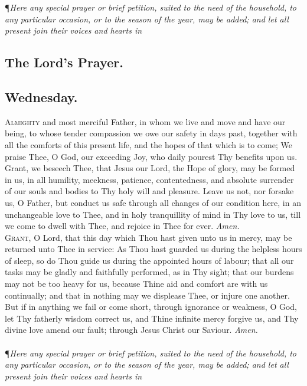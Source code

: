 \noindent\P\textit{Here any special prayer or brief petition, suited to the need of the
household, to any particular occasion, or to the season of the
year, may be added; and let all present join their voices and
hearts in}

\subsection*{The Lord's Prayer.}

\subsection*{Wednesday.}

\lettrine{A}{lmighty} and most merciful Father, in whom we
live and move and have our being, to whose tender
compassion we owe our safety in days past, together with
all the comforts of this present life, and the hopes of that
which is to come; We praise Thee, O God, our exceeding
Joy, who daily pourest Thy benefits upon us. Grant, we
beseech Thee, that Jesus our Lord, the Hope of glory, may
be formed in us, in all humility, meekness, patience, contentedness, and absolute surrender of our souls and bodies
to Thy holy will and pleasure. Leave us not, nor forsake
us, O Father, but conduct us safe through all changes of
our condition here, in an unchangeable love to Thee, and in
holy tranquillity of mind in Thy love to us, till we come to
dwell with Thee, and rejoice in Thee for ever.
\textit{Amen.} \\

\lettrine{G}{rant,} O Lord, that this day which Thou hast given
unto us in mercy, may be returned unto Thee in service: As Thou hast guarded us during the helpless hours
of sleep, so do Thou guide us during the appointed hours
of labour; that all our tasks may be gladly and faithfully
performed, as in Thy sight; that our burdens may not be
too heavy for us, because Thine aid and comfort are with
us continually; and that in nothing may we displease Thee,
or injure one another. But if in anything we fail or come
short, through ignorance or weakness, O God, let Thy
fatherly wisdom correct us, and Thine infinite mercy forgive us, and Thy divine love amend our fault; through
Jesus Christ our Saviour.
\textit{Amen.} \\ \\

\noindent\P\textit{Here any special prayer or brief petition, suited to the need of the household, to any particular occasion, or to the season of the
year, may be added; and let all present join their voices and
hearts in}

